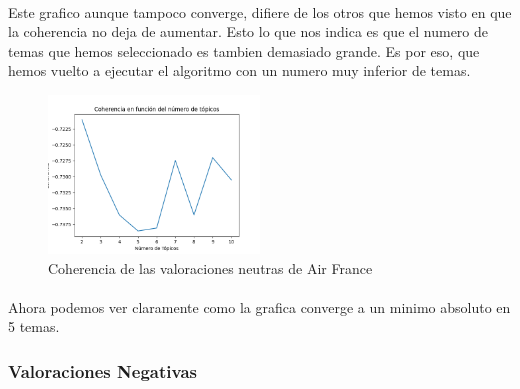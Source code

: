 \documentclass{report}
\begin{document}
{{                    \paragraph*{}{
                        Este grafico aunque tampoco converge, difiere de los otros que hemos visto en que la coherencia no deja de aumentar.
                        Esto lo que nos indica es que el numero de temas que hemos seleccionado es tambien demasiado grande.
                        Es por eso, que hemos vuelto a ejecutar el algoritmo con un numero muy inferior de temas.
                    }
                    \begin{figure}[H]
                        \centering
                        \includegraphics[width=0.5\textwidth]{./img/air_france_neutras2.png}
                        \caption{Coherencia de las valoraciones neutras de Air France}
                    \end{figure}
                    \paragraph*{}{
                        Ahora podemos ver claramente como la grafica converge a un minimo absoluto en 5 temas.
                    }
                \clearpage\subsubsection*{Valoraciones Negativas}
}}
\end{document}

